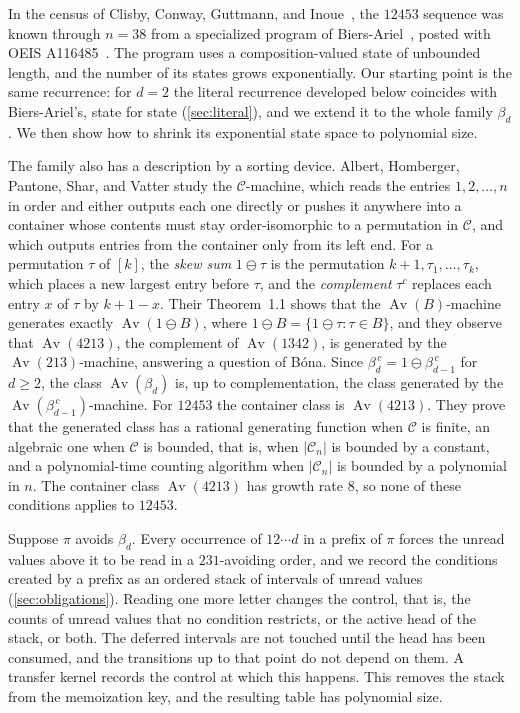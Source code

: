 \documentclass[11pt,reqno]{amsart}
\theoremstyle{definition}
\theoremstyle{remark}
\newcommand{\Av}{\operatorname{Av}}
\begin{document}
In the census of Clisby, Conway, Guttmann, and
Inoue~\cite{ClisbyConwayGuttmannInoue2022}, the $12453$ sequence was known
through $n=38$ from a specialized program of
Biers-Ariel~\cite{BiersArielA116485}, posted with OEIS
A116485~\cite{OEISA116485}.  The program uses a
composition-valued state of unbounded length, and the number of its states
grows exponentially.  Our starting point is the same recurrence: for $d=2$
the literal recurrence developed below coincides with Biers-Ariel's, state
for state (\cref{sec:literal}), and we extend it to the whole family
$\beta_d$.  We then show how
to shrink its exponential state space to polynomial size.

The family also has a description by a sorting device.  Albert, Homberger,
Pantone, Shar, and Vatter \cite{AlbertHombergerPantoneSharVatter2018} study
the $\mathcal C$-machine, which reads the entries $1,2,\ldots,n$ in order
and either outputs each one directly or pushes it anywhere into a container
whose contents must stay order-isomorphic to a permutation in $\mathcal C$,
and which outputs entries from the container only from its left end.  For
a permutation $\tau$ of $[k]$, the \emph{skew sum} $1\ominus\tau$ is the
permutation $k+1,\tau_1,\ldots,\tau_k$, which places a new largest entry
before $\tau$, and the \emph{complement} $\tau^{c}$ replaces each entry $x$
of $\tau$ by $k+1-x$.  Their Theorem~1.1 shows that the $\Av(B)$-machine
generates exactly $\Av(1\ominus B)$, where
$1\ominus B=\{1\ominus\tau:\tau\in B\}$, and they observe that $\Av(4213)$,
the complement of $\Av(1342)$, is generated by the $\Av(213)$-machine,
answering a question of B\'ona.  Since
$\beta_d^{\,c}=1\ominus\beta_{d-1}^{\,c}$ for $d\geq2$, the class
$\Av(\beta_d)$ is, up to complementation, the class generated by the
$\Av(\beta_{d-1}^{\,c})$-machine.  For $12453$ the container
class is $\Av(4213)$.  They prove that the generated class has a rational generating function when
$\mathcal C$ is finite, an algebraic one when $\mathcal C$ is bounded, that is,
when $|\mathcal C_n|$ is bounded by a constant, and a polynomial-time counting
algorithm when $|\mathcal C_n|$ is bounded by a polynomial in $n$.  The container
class $\Av(4213)$ has growth rate $8$, so none of these conditions applies to
$12453$.

Suppose $\pi$ avoids $\beta_d$.  Every occurrence of $12\cdots d$ in a
prefix of $\pi$ forces the unread values above it to be read in a
$231$-avoiding order, and we record the conditions created by a prefix as
an ordered stack of intervals of unread values (\cref{sec:obligations}).
Reading one more letter changes the control, that is, the counts of unread
values that no condition restricts, or the active head of the stack, or
both.  The deferred intervals are not touched until the head has been
consumed, and the transitions up to that point do not depend on them.  A
transfer kernel records the control at which this happens.  This removes
the stack from the memoization key, and the resulting table has polynomial
size.
\end{document}
